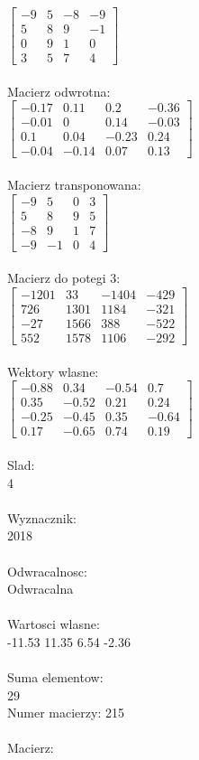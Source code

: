 \documentclass[a4paper,12pt]{article}
\begin{document}
$\begin{bmatrix} -9&5&-8&-9\\5&8&9&-1\\0&9&1&0\\3&5&7&4 \end{bmatrix}$
\\
\\
Macierz odwrotna:\\

$\begin{bmatrix} -0.17&0.11&0.2&-0.36\\-0.01&0&0.14&-0.03\\0.1&0.04&-0.23&0.24\\-0.04&-0.14&0.07&0.13 \end{bmatrix}$
\\
\\
Macierz transponowana:\\

$\begin{bmatrix} -9&5&0&3\\5&8&9&5\\-8&9&1&7\\-9&-1&0&4 \end{bmatrix}$
\\
\\
Macierz do potegi 3:\\

$\begin{bmatrix} -1201&33&-1404&-429\\726&1301&1184&-321\\-27&1566&388&-522\\552&1578&1106&-292 \end{bmatrix}$
\\
\\
Wektory wlasne:\\

$\begin{bmatrix} -0.88&0.34&-0.54&0.7\\0.35&-0.52&0.21&0.24\\-0.25&-0.45&0.35&-0.64\\0.17&-0.65&0.74&0.19 \end{bmatrix}$
\\
\\
Slad:\\
4
\\
\\
Wyznacznik:\\
2018
\\
\\
Odwracalnosc:\\
Odwracalna
\\
\\
Wartosci wlasne:\\
-11.53 11.35 6.54 -2.36
\\
\\
Suma elementow:\\
29
\\
\newpage
Numer macierzy:
215
\\
\\
Macierz:\\
\end{document}
